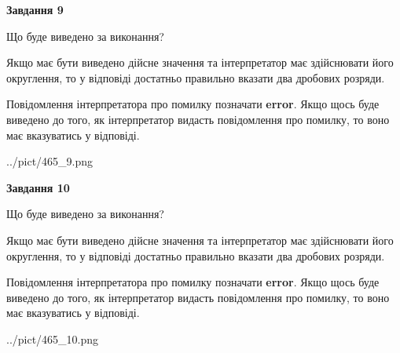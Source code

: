 \documentclass[12pt, ukrainian]{article}
\begin{document}
{\begin {Large}
{\begin {center}\textbf{Завдання 9}\end {center}}\par
Що буде виведено за виконання? \par

Якщо має бути виведено дійсне значення та інтерпретатор має здійснювати його округлення, 
то у відповіді достатньо правильно вказати два дробових розряди.

Повідомлення інтерпретатора про помилку позначати \textbf{error}.
Якщо щось буде виведено до того, як інтерпретатор видасть повідомлення про помилку, 
то воно має вказуватись у відповіді. \par

\begin{center}
	{../pict/465_9.png}
\end{center}
\newpage

{\begin {center}\textbf{Завдання 10}\end {center}}\par
Що буде виведено за виконання? \par

Якщо має бути виведено дійсне значення та інтерпретатор має здійснювати його округлення, 
то у відповіді достатньо правильно вказати два дробових розряди.

Повідомлення інтерпретатора про помилку позначати \textbf{error}.
Якщо щось буде виведено до того, як інтерпретатор видасть повідомлення про помилку, 
то воно має вказуватись у відповіді. \par

\begin{center}
	{../pict/465_10.png}
\end{center}
\newpage

\end {Large}}
\end{document}
